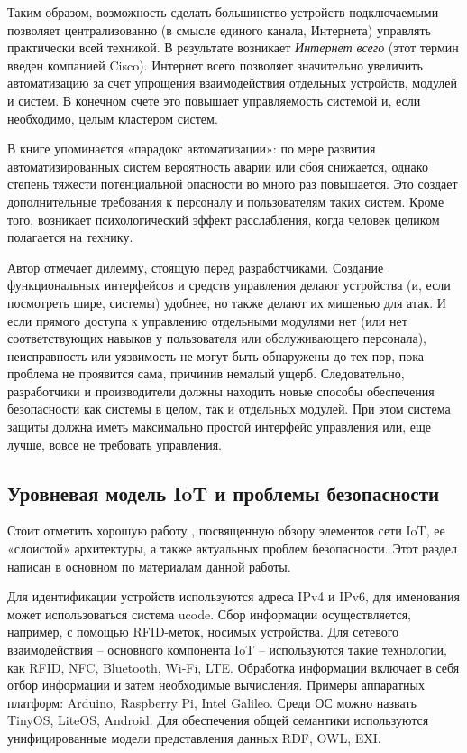 Таким образом, возможность сделать большинство устройств подключаемыми позволяет централизованно (в смысле единого канала, Интернета) управлять практически всей техникой. В результате возникает \textit{Интернет всего} (этот термин введен компанией Cisco). Интернет всего позволяет значительно увеличить автоматизацию за счет упрощения взаимодействия отдельных устройств, модулей и систем. В конечном счете это повышает управляемость системой и, если необходимо, целым кластером систем.

В книге упоминается «парадокс автоматизации»: по мере развития автоматизированных систем вероятность аварии или сбоя снижается, однако степень тяжести потенциальной опасности во много раз повышается. Это создает дополнительные требования к персоналу и пользователям таких систем. Кроме того, возникает психологический эффект расслабления, когда человек целиком полагается на технику.

Автор отмечает дилемму, стоящую перед разработчиками. Создание функциональных интерфейсов и средств управления делают устройства (и, если посмотреть шире, системы) удобнее, но также делают их мишенью для атак. И если прямого доступа к управлению отдельными модулями нет (или нет соответствующих навыков у пользователя или обслуживающего персонала), неисправность или уязвимость не могут быть обнаружены до тех пор, пока проблема не проявится сама, причинив немалый ущерб. Следовательно, разработчики и производители должны находить новые способы обеспечения безопасности как системы в целом, так и отдельных модулей. При этом система защиты должна иметь максимально простой интерфейс управления или, еще лучше, вовсе не требовать управления.

\subsection{Уровневая модель IoT и проблемы безопасности} %

Стоит отметить хорошую работу \cite{src20}, посвященную обзору элементов сети IoT, ее «слоистой» архитектуры, а также актуальных проблем безопасности. Этот раздел написан в основном по материалам данной работы.

Для идентификации устройств используются адреса IPv4 и IPv6, для именования может использоваться система ucode. Сбор информации осуществляется, например, с помощью RFID-меток, носимых устройства. Для сетевого взаимодействия – основного компонента IoT – используются такие технологии, как RFID, NFC, Bluetooth, Wi-Fi, LTE. Обработка информации включает в себя отбор информации и затем необходимые вычисления. Примеры аппаратных платформ: Arduino, Raspberry Pi, Intel Galileo. Среди ОС можно назвать TinyOS, LiteOS, Android. Для обеспечения общей семантики используются унифицированные модели представления данных RDF, OWL, EXI.

